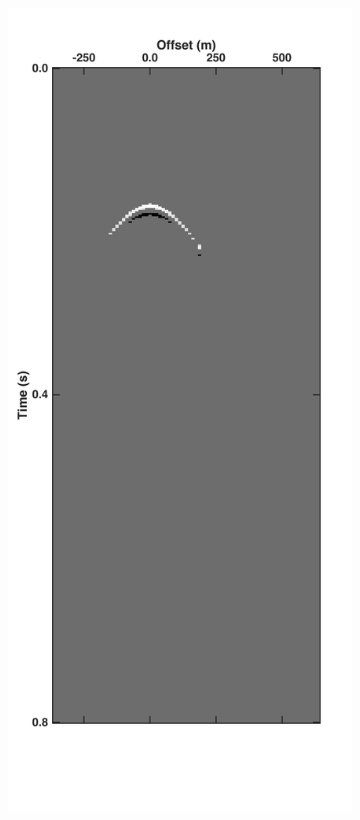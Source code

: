 \begin{figure}
\begin{subfigure}[t]{0.25\textwidth}
		\caption{}
		\label{fig:Ch-Theory-FKFiltered}
	\end{subfigure}
	\begin{subfigure}[t]{0.25\textwidth}
		\includegraphics[width=\textwidth]{Plots/Mahdad/5iter/ThresholdCRG_rec30}	

\end{subfigure}
\end{figure}
